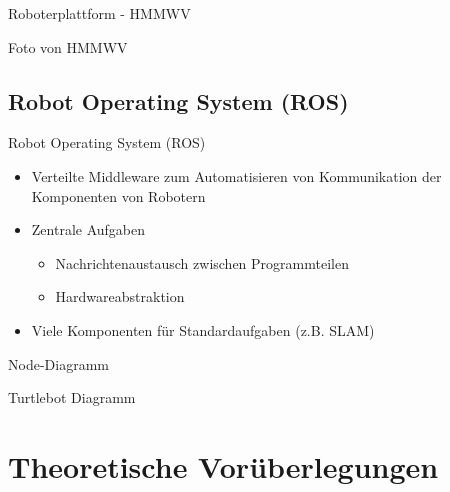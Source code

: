 \documentclass[18pt]{beamer}
\begin{document}
\begin{frame}{Roboterplattform - HMMWV}
	\begin{center}
		Foto von HMMWV
	\end{center}
\end{frame}


\subsection{Robot Operating System (ROS)}
\begin{frame}{Robot Operating System (ROS)}
	\begin{itemize}
		\item Verteilte Middleware zum Automatisieren von Kommunikation der Komponenten von Robotern
		\item Zentrale Aufgaben
		\begin{itemize}
			\item Nachrichtenaustausch zwischen Programmteilen
			\item Hardwareabstraktion
		\end{itemize}
		\item Viele Komponenten für Standardaufgaben (z.B. SLAM)
	\end{itemize}
\end{frame}

\begin{frame}{Node-Diagramm}
	\begin{center}
		Turtlebot Diagramm
	\end{center}
\end{frame}



\section{Theoretische Vorüberlegungen}
\end{document}
